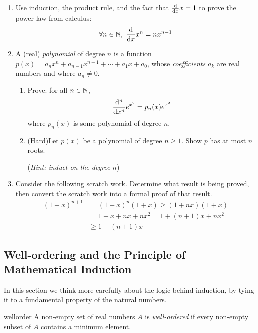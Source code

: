 \begin{exercises}{}{}
\begin{enumerate}
		\item Use induction, the product rule, and the fact that $\diff xx=1$ to prove the power law from calculus:
		\[
	    \forall n\in\N,\ \diff x x^n =nx^{n-1}
		\]


		\item A (real) \emph{polynomial} of degree $n$ is a function $p(x)=a_nx^n+a_{n-1}x^{n-1}+ \cdots +a_1x+a_0$, whose \emph{coefficients} $a_k$ are real numbers and where $a_n\neq 0$.
		\begin{enumerate}
    	\item Prove: for all $n\in\N$,
    	\[
        \diff[{}^n]{x^n} e^{x^2} = p_n(x) e^{x^2}
    	\]
    	where $p_n(x)$ is some polynomial of degree $n$.

			\item (Hard)\lstsp Let $p(x)$ be a polynomial of degree $n\ge 1$. Show $p$ has at most $n$ roots.\par
			(\emph{Hint: induct on the degree $n$})
		\end{enumerate}


		\item Consider the following scratch work. Determine what result is being proved, then convert the scratch work into a formal proof of that result.
	  \begin{align*}
	    (1+x)^{n+1}&=(1+x)^n(1+x)\ge (1+nx)(1+x)\\
	    &=1+x+nx+nx^2=1+(n+1)x+nx^2\\
	    &\ge 1+(n+1)x
	  \end{align*}

	\end{enumerate}

\end{exercises}

\clearpage



\subsection{Well-ordering and the Principle of Mathematical Induction}\label{sec:wellorder}


In this section we think more carefully about the logic behind induction, by tying it to a fundamental property of the natural numbers.

\begin{defn}{}{wellorder}
	A non-empty set of real numbers $A$ is \emph{well-ordered} if every non-empty subset of $A$ contains a minimum element.
\end{defn}

